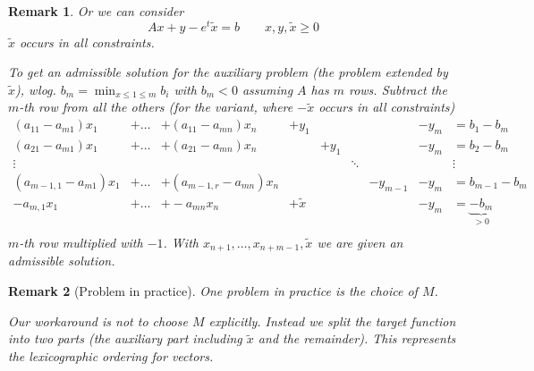 \documentclass[a4paper]{article}
\numberwithin{lecref}{section}
\newtheorem*{Remark}{Remark}
\begin{document}
\begin{Remark}
	Or we can consider 
	\[ Ax + y - e^t \tilde x = b \qquad x, y, \tilde x \geq 0 \]
	$\tilde x$ occurs in all constraints.

	To get an admissible solution for the auxiliary problem (the problem extended by $\tilde x$), wlog. $b_m = \min_{x \leq 1 \leq m} b_i$ with $b_m < 0$ assuming $A$ has $m$ rows.
	Subtract the $m$-th row from all the others (for the variant, where $-\tilde x$ occurs in all constraints)
	\begin{align}
		\label{mat}
		(a_{11} - a_{m1}) x_1 &+ \dots &+ (a_{11} - a_{mn}) x_n &+ y_1  &       &        &          & -y_m &= b_1 - b_m \\
		(a_{21} - a_{m1}) x_1 &+ \dots &+ (a_{21} - a_{mn}) x_n &       &+ y_1  &        &          & -y_m &= b_2 - b_m \nonumber\\
		\vdots                &        &                        &       &       & \ddots &          &      &\vdots \nonumber\\
		(a_{m-1,1} - a_{m1}) x_1 &+ \dots &+ (a_{m-1,r} - a_{mn}) x_n & &       &        & -y_{m-1} & -y_m &= b_{m-1} - b_m \nonumber\\
		-a_{m,1} x_1 &+ \dots &+ -a_{mn} x_n & + \tilde x &       &        &  & -y_m &= \underbrace{-b_{m}}_{>0} \nonumber\\
	\end{align}
	$m$-th row multiplied with $-1$.
	With $x_{n+1}, \dots, x_{n+m-1}, \tilde x$ we are given an admissible solution.
\end{Remark}

\begin{Remark}[Problem in practice]
	One problem in practice is the choice of $M$.

	Our workaround is not to choose $M$ explicitly. Instead we split the target function into two parts (the auxiliary part including $\tilde x$ and the remainder).
	This represents the lexicographic ordering for vectors.
\end{Remark}
\end{document}
